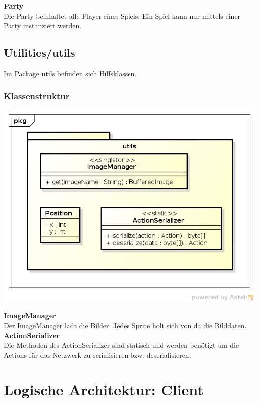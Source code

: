 \documentclass[11pt]{scrartcl}
\begin{document}
\textbf{Party}\\
Die Party beinhaltet alle Player eines Spiels. Ein Spiel kann nur mittels einer Party instanziert werden.

\newpage

\subsection{Utilities/utils}
Im Package utils befinden sich Hilfsklassen.
\subsubsection{Klassenstruktur}
\includegraphics[scale=0.75]{ClassDiagramUtils}

\textbf{ImageManager}\\
Der ImageManager lädt die Bilder. Jedes Sprite holt sich von da die Bilddaten.\\

\textbf{ActionSerializer}\\
Die Methoden des ActionSerializer sind statisch und werden benötigt um die Actions für das Netzwerk zu serialisieren bzw. deserialisieren.\\

\newpage

\section{Logische Architektur: Client}
\end{document}

